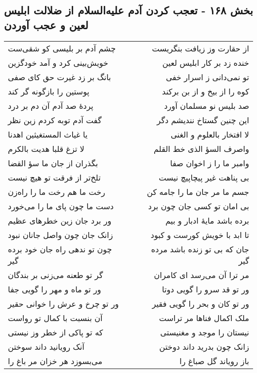 \begin{center}
\section*{بخش ۱۶۸ - تعجب کردن آدم علیه‌السلام از ضلالت  ابلیس لعین و عجب آوردن}
\label{sec:sh168}
\begin{longtable}{l p{0.5cm} r}
چشم آدم بر بلیسی کو شقی‌ست
&&
از حقارت وز زیافت بنگریست
\\
خویش‌بینی کرد و آمد خودگزین
&&
خنده زد بر کار ابلیس لعین
\\
بانگ بر زد غیرت حق کای صفی
&&
تو نمی‌دانی ز اسرار خفی
\\
پوستین را بازگونه گر کند
&&
کوه را از بیخ و از بن برکند
\\
پردهٔ صد آدم آن دم بر درد
&&
صد بلیس نو مسلمان آورد
\\
گفت آدم توبه کردم زین نظر
&&
این چنین گستاخ نندیشم دگر
\\
یا غیاث المستغیثین اهدنا
&&
لا افتخار بالعلوم و الغنی
\\
لا تزغ قلبا هدیت بالکرم
&&
واصرف السؤ الذی خط القلم
\\
بگذران از جان ما سؤ القضا
&&
وامبر ما را ز اخوان صفا
\\
تلخ‌تر از فرقت تو هیچ نیست
&&
بی پناهت غیر پیچاپیچ نیست
\\
رخت ما هم رخت ما را راه‌زن
&&
جسم ما مر جان ما را جامه کن
\\
دست ما چون پای ما را می‌خورد
&&
بی امان تو کسی جان چون برد
\\
ور برد جان زین خطرهای عظیم
&&
برده باشد مایهٔ ادبار و بیم
\\
زانک جان چون واصل جانان نبود
&&
تا ابد با خویش کورست و کبود
\\
چون تو ندهی راه جان خود برده گیر
&&
جان که بی تو زنده باشد مرده گیر
\\
گر تو طعنه می‌زنی بر بندگان
&&
مر ترا آن می‌رسد ای کامران
\\
ور تو ماه و مهر را گویی جفا
&&
ور تو قد سرو را گویی دوتا
\\
ور تو چرخ و عرش را خوانی حقیر
&&
ور تو کان و بحر را گویی فقیر
\\
آن بنسبت با کمال تو رواست
&&
ملک اکمال فناها مر تراست
\\
که تو پاکی از خطر وز نیستی
&&
نیستان را موجد و مغنیستی
\\
آنک رویانید داند سوختن
&&
زانک چون بدرید داند دوختن
\\
می‌بسوزد هر خزان مر باغ را
&&
باز رویاند گل صباغ را
\\

\end{longtable}
\end{center}
